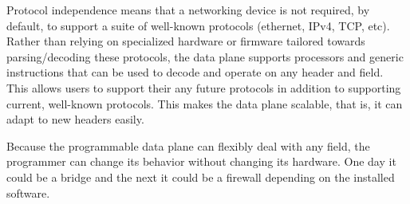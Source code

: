 
Protocol independence means that a networking device is not required, by default, to support
a suite of well-known protocols (ethernet, IPv4, TCP, etc).
Rather than relying on specialized hardware or firmware tailored towards
parsing/decoding
these protocols, the data plane supports processors
and generic instructions that can be used to decode and operate on
any header and field.
This allows users to support their any future protocols in addition to
supporting current, well-known protocols. This makes the data plane scalable, that is, it
can adapt to new headers easily.

Because the programmable data plane can flexibly deal with any field, the programmer can change its behavior without changing its hardware. One day it could be a bridge and the next it could be a firewall depending on the installed software.

%
%





